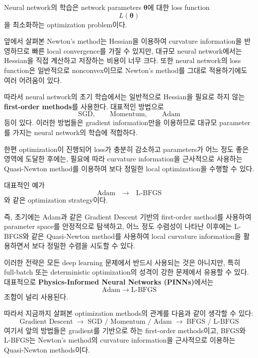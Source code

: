 \documentclass[11pt,a4paper]{article}
\begin{document}
Neural network의 학습은 network parameters
$\boldsymbol{\theta}$에 대한 loss function
\[
L(\boldsymbol{\theta})
\]
을 최소화하는 optimization problem이다.

앞에서 살펴본 Newton's method는 Hessian을 이용하여 curvature information을
반영하므로 빠른 local convergence를 가질 수 있지만, 대규모 neural
network에서는 Hessian을 직접 계산하고 저장하는 비용이 너무 크다.
또한 neural network의 loss function은 일반적으로 nonconvex이므로
Newton's method를 그대로 적용하기에도 여러 어려움이 있다.

따라서 neural network의 초기 학습에서는 일반적으로 Hessian을 필요로 하지
않는 \textbf{first-order methods}를 사용한다. 대표적인 방법으로
\[
\text{SGD},\qquad
\text{Momentum},\qquad
\text{Adam}
\]
등이 있다. 이러한 방법들은 gradient information만을 이용하므로
대규모 parameter를 가지는 neural network의 학습에 적합하다.

한편 optimization이 진행되어 loss가 충분히 감소하고 parameters가
어느 정도 좋은 영역에 도달한 후에는, 필요에 따라 curvature information을
근사적으로 사용하는 Quasi-Newton method를 이용하여 보다 정밀한
local optimization을 수행할 수 있다.

대표적인 예가
\[
\boxed{
\text{Adam}
\quad\longrightarrow\quad
\text{L-BFGS}
}
\]
와 같은 optimization strategy이다.

즉, 초기에는 Adam과 같은 Gradient Descent 기반의 first-order method를
사용하여 parameter space를 안정적으로 탐색하고, 어느 정도 수렴성이
나타난 이후에는 L-BFGS와 같은 Quasi-Newton method를 사용하여
local curvature information을 활용하면서 보다 정밀한 수렴을
시도할 수 있다.

이러한 전략은 모든 deep learning 문제에서 반드시 사용되는 것은 아니지만,
특히 full-batch 또는 deterministic optimization의 성격이 강한 문제에서
유용할 수 있다. 대표적으로
\textbf{Physics-Informed Neural Networks (PINNs)}에서는
\[
\text{Adam} \;\longrightarrow\; \text{L-BFGS}
\]
조합이 널리 사용된다.

따라서 지금까지 살펴본 optimization methods의 관계를 다음과 같이
생각할 수 있다:
\[
\boxed{
\text{Gradient Descent}
\;\longrightarrow\;
\text{SGD / Momentum / Adam}
\;\longrightarrow\;
\text{BFGS / L-BFGS}
}
\]
여기서 앞의 방법들은 gradient를 기반으로 하는 first-order methods이고,
BFGS와 L-BFGS는 Newton's method의 curvature information을
근사적으로 이용하는 Quasi-Newton methods이다.
\end{document}

